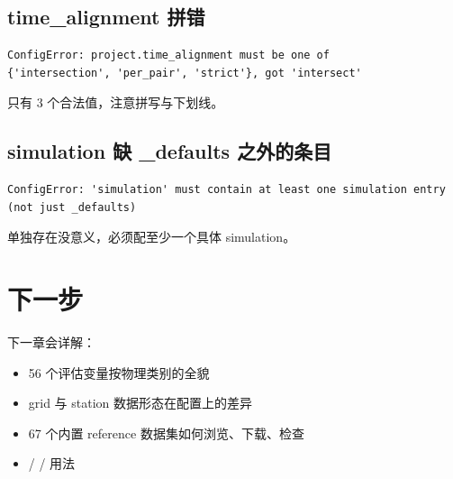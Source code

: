 \subsection{time\_alignment 拼错}

\begin{verbatim}
ConfigError: project.time_alignment must be one of
{'intersection', 'per_pair', 'strict'}, got 'intersect'
\end{verbatim}

只有 3 个合法值，注意拼写与下划线。

\subsection{simulation 缺 _defaults 之外的条目}

\begin{verbatim}
ConfigError: 'simulation' must contain at least one simulation entry
(not just _defaults)
\end{verbatim}

 单独存在没意义，必须配至少一个具体 simulation。

\section{下一步}

下一章会详解：

\begin{itemize}
  \item 56 个评估变量按物理类别的全貌
  \item grid 与 station 数据形态在配置上的差异
  \item 67 个内置 reference 数据集如何浏览、下载、检查
  \item {} /  /  用法
\end{itemize}
